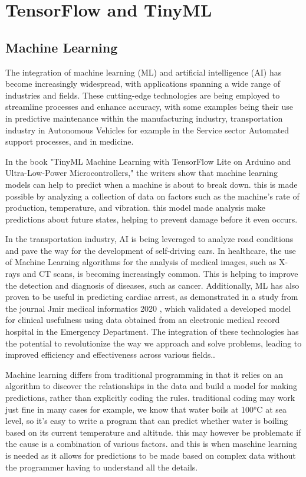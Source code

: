 \chapter{TensorFlow and TinyML}
\label{TFandTML}
\section{Machine Learning}
The integration of machine learning (ML) and artificial intelligence (AI) has become increasingly widespread, with applications spanning a wide range of industries and fields. These cutting-edge technologies are being employed to streamline processes and enhance accuracy, with some examples being their use in predictive maintenance within the manufacturing industry, transportation industry in Autonomous Vehicles for example in the Service sector Automated support processes,  \cite{McKinsey:2017}  and in medicine.

In the book "TinyML Machine Learning with TensorFlow Lite on Arduino and Ultra-Low-Power Microcontrollers," \cite{Warden:2020} the writers show that machine learning models can help to predict when a machine is about to break down. 
this is made possible by analyzing a collection of data on factors such as the machine's rate of production, temperature, and vibration.
this model made analysis make predictions about future states, helping to prevent damage before it even occurs.

In the transportation industry, AI is being leveraged to analyze road conditions and pave the way for the development of self-driving cars. In healthcare, the use of Machine Learning algorithms for the analysis of medical images, such as X-rays and CT scans, is becoming increasingly common. This is helping to improve the detection and diagnosis of diseases, such as cancer. Additionally, ML has also proven to be useful in predicting cardiac arrest, as demonstrated in a study from the journal Jmir medical informatics 2020 \cite{JMIR:2020}, which validated a developed model for clinical usefulness using data obtained from an electronic medical record hospital in the Emergency Department. The integration of these technologies has the potential to revolutionize the way we approach and solve problems, leading to improved efficiency and effectiveness across various fields..\cite{Dokic:2020}

Machine learning differs from traditional programming in that it relies on an algorithm to discover the relationships in the data and build a model for making predictions, rather than explicitly coding the rules. traditional coding may work just fine in many cases for example, we know that water boils at 100°C at sea level, so it’s easy to write a program that can predict whether water is boiling based on its current temperature and altitude. this may however be problematc if the cause is a combination of various factors. and this is when maschine learning is needed as it allows for predictions to be made based on complex data without the programmer having to understand all the details.  \cite{Warden:2020}	

